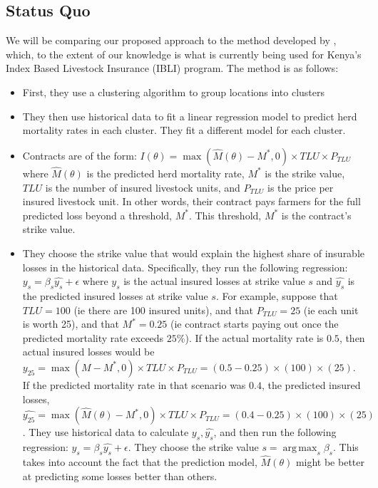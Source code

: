 \documentclass[11pt]{article}
\DeclareMathOperator*{\argmax}{arg\,max}
\begin{document}
  \subsection{Status Quo} \label{status-quo}
  We will be comparing our proposed approach to the method developed by \cite{chantarat2013designing}, which, to the extent of our knowledge is what is currently being used for Kenya's Index Based Livestock Insurance (IBLI) program. The method is as follows: 
  \begin{itemize}
      \item First, they use a clustering algorithm to group locations into clusters
      \item They then use historical data to fit a linear regression model to predict herd mortality rates in each cluster. They fit a different model for each cluster. 
      \item Contracts are of the form: $I(\theta) = \max(\hat{M}(\theta)-M^*,0)\times TLU \times P_{TLU}$ where $\hat{M}(\theta)$ is the predicted herd mortality rate, $M^*$ is the strike value, $TLU$ is the number of insured livestock units, and $P_{TLU}$ is the price per insured livestock unit.  In other words, their contract pays farmers for the full predicted loss beyond a threshold, $M^*$. This threshold, $M^*$ is the contract's strike value. 
      \item They choose the strike value that would explain the highest share of insurable losses in the historical data. Specifically, they run the following regression: $y_s = \beta_s \hat{y_s}+\epsilon$ where $y_s$ is the actual insured losses at strike value $s$ and $\hat{y_s}$ is the predicted insured losses at strike value $s$. For example, suppose that $TLU=100$ (ie there are 100 insured units), and that $P_{TLU}=25$ (ie each unit is worth 25), and that $M^* = 0.25$ (ie contract starts paying out once the predicted mortality rate exceeds $25\%$). If the actual mortality rate is $0.5$, then actual insured losses would be $y_{25} = \max(M-M^*,0)\times TLU \times P_{TLU} = (0.5-0.25)\times(100) \times (25)$. If the predicted mortality rate in that scenario was $0.4$, the predicted insured losses, $\hat{y_{25}} = \max(\hat{M}(\theta)-M^*,0)\times TLU \times P_{TLU} = (0.4-0.25)\times(100) \times (25)$. They use historical data to calculate $y_s, \hat{y_s}$, and then run the following regression: $y_s = \beta_s \hat{y_s}+\epsilon$. They choose the strike value $s= \argmax_s \beta_s$. This takes into account the fact that the prediction model, $\hat{M}(\theta)$ might be better at predicting some losses better than others. 
  \end{itemize}
  
\end{document}
